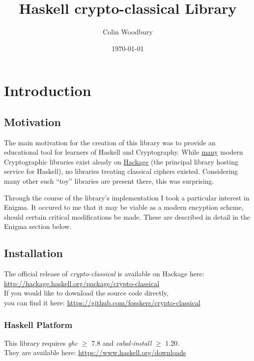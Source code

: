 \documentclass{article}
\begin{document}
\title{Haskell crypto-classical Library}
\author{Colin Woodbury}
\date{\today}
\maketitle

\tableofcontents
\clearpage

\section{Introduction}
\subsection{Motivation}
The main motivation for the creation of this library was to provide
an educational tool for learners of Haskell and Cryptography. While
\href{http://hackage.haskell.org/packages/search?terms=crypto}{many}
modern Cryptographic libraries exist aleady on
\href{http://hackage.haskell.org}{Hackage} (the principal
library hosting service for Haskell), no libraries treating classical
ciphers existed. Considering many other such ``toy'' libraries are
present there, this was surprising.

Through the course of the library's implementation I took a particular
interest in Enigma. It occured to me that it may be viable
as a modern encyption scheme, should certain critical modifications
be made. These are described in detail in the Enigma section below.

\subsection{Installation}
The official release of \emph{crypto-classical} is available on Hackage
here: \url{http://hackage.haskell.org/package/crypto-classical}\\
If you would like to download the source code directly,\\
you can find it here: \url{https://github.com/fosskers/crypto-classical}

\subsubsection{Haskell Platform}
This library requires \emph{ghc} $\geq$ 7.8 and
\emph{cabal-install} $\geq$ 1.20.\\
They are available here: \url{https://www.haskell.org/downloads}
\end{document}
